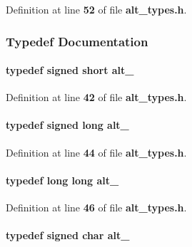 Definition at line {\bf 52} of file {\bf alt\+\_\+types.\+h}.



\subsubsection{Typedef Documentation}
\paragraph[{alt\+\_\+16}]{\setlength{\rightskip}{0pt plus 5cm}typedef signed short {\bf alt\+\_}}\label{alt__types_8h_ae36d01cbee9b6877981147f5252f4946}


Definition at line {\bf 42} of file {\bf alt\+\_\+types.\+h}.

\paragraph[{alt\+\_\+32}]{\setlength{\rightskip}{0pt plus 5cm}typedef signed long {\bf alt\+\_}}\label{alt__types_8h_ae33df531659dabd33aead9e759a55d87}


Definition at line {\bf 44} of file {\bf alt\+\_\+types.\+h}.

\paragraph[{alt\+\_\+64}]{\setlength{\rightskip}{0pt plus 5cm}typedef long long {\bf alt\+\_}}\label{alt__types_8h_a6615d3229eb47488e22587e941dba873}


Definition at line {\bf 46} of file {\bf alt\+\_\+types.\+h}.

\paragraph[{alt\+\_\+8}]{\setlength{\rightskip}{0pt plus 5cm}typedef signed char {\bf alt\+\_}}\label{alt__types_8h_a0d67265ff316f143058f61e1d30c948c}


